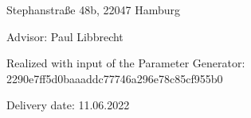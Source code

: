 \vspace*{-6mm}

\begin{large} 
\begin{center}
Stephanstraße 48b, 22047 Hamburg
\end{center}
\end{large} 

\vspace*{-6mm}


\vspace*{5mm}

\begin{large} 
\begin{center}
Advisor: Paul Libbrecht
\end{center}
\end{large} 

\begin{large} 
\begin{center}
Realized with input of the Parameter Generator: 2290e7ff5d0baaaddc77746a296e78c85cf955b0
\end{center}
\end{large} 



\vspace*{-6mm}

\begin{large} 
\begin{center}
Delivery date: 11.06.2022
\end{center}
\end{large} 


\pagestyle{empty} %


